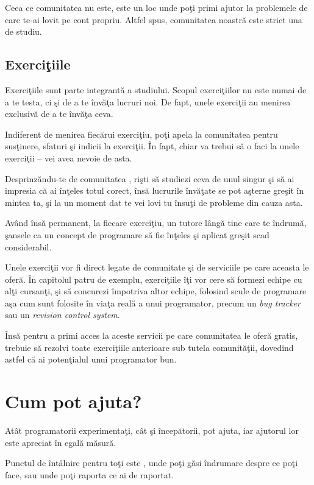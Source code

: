 Ceea ce comunitatea {\phpro} nu este, este un loc unde poţi primi ajutor la
problemele de care te-ai lovit pe cont propriu. Altfel spus, comunitatea
noastră este strict una de studiu.

{}
\subsection*{Exerciţiile}

Exerciţiile sunt parte integrantă a studiului. Scopul exerciţiilor nu
este numai de a te testa, ci şi de a te învăţa lucruri noi. De fapt,
unele exerciţii au menirea exclusivă de a te învăţa ceva.

Indiferent de menirea fiecărui exerciţiu, poţi apela la comunitatea
{\phpro} pentru susţinere, sfaturi şi indicii la exerciţii. În fapt,
chiar va trebui să o faci la unele exerciţii -- vei avea nevoie de asta.

Desprinzăndu-te de comunitatea \phpro, rişti să studiezi ceva de unul
singur şi să ai impresia că ai înţeles totul corect, însă lucrurile învăţate
se pot aşterne greşit în mintea ta, şi la un moment dat te vei lovi
tu însuţi de probleme din cauza asta.

Având însă permanent, la fiecare exerciţiu, un tutore lângă tine care te
îndrumă, şansele ca un concept de programare să fie înţeles şi aplicat
greşit scad considerabil.

Unele exerciţii vor fi direct legate de comunitate şi de serviciile pe care
aceasta le oferă. În capitolul patru de exemplu, exerciţiile îţi vor 
cere să formezi echipe cu alţi cursanţi, şi să concurezi împotriva altor echipe, folosind
scule de programare aşa cum sunt folosite în viaţa reală a unui programator,
precum un \textsl{bug tracker} sau un \textsl{revision control system}.

Însă pentru a primi acces la aceste servicii pe care comunitatea
{\phpro} le oferă gratis, trebuie să rezolvi toate exerciţiile anterioare
sub tutela comunităţii, dovedind astfel că ai potenţialul unui
programator bun.

{}
\section*{Cum pot ajuta?}
Atât programatorii experimentaţi, cât şi începătorii, pot ajuta,
iar ajutorul lor este apreciat în egală măsură.

Punctul de întâlnire pentru toţi este \phpro, unde poţi
găsi îndrumare despre ce poţi face, sau unde poţi raporta
ce ai de raportat.

